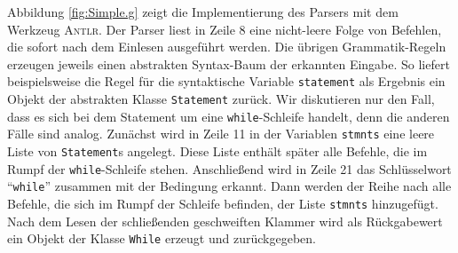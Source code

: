 \vspace*{\fill} \pagebreak

\vspace*{\fill} \pagebreak

\noindent
Abbildung \ref{fig:Simple.g} zeigt die Implementierung des Parsers mit dem
Werkzeug \textsc{Antlr}.  Der Parser liest in Zeile 8 eine nicht-leere Folge von Befehlen,
die sofort nach dem Einlesen ausgef\"uhrt werden.  Die \"ubrigen Grammatik-Regeln erzeugen
jeweils einen abstrakten Syntax-Baum der erkannten Eingabe.  So liefert beispielsweise die
Regel f\"ur die syntaktische Variable \texttt{statement} als Ergebnis ein Objekt der
abstrakten Klasse \texttt{Statement} zur\"uck.  Wir diskutieren nur den Fall, dass es sich
bei dem Statement um eine \texttt{while}-Schleife handelt, denn die anderen F\"alle sind
analog.  Zun\"achst wird in Zeile 11 in der Variablen \texttt{stmnts} eine leere Liste  von
\texttt{Statement}s angelegt. 
Diese Liste enth\"alt sp\"ater alle Befehle, die im Rumpf der \texttt{while}-Schleife stehen.
Anschlie{\ss}end wird in Zeile 21 das Schl\"usselwort ``\texttt{while}'' zusammen mit der Bedingung erkannt.
Dann werden der Reihe nach alle Befehle, die sich im Rumpf der Schleife befinden, der
Liste \texttt{stmnts} hinzugef\"ugt.  Nach dem Lesen der schlie{\ss}enden geschweiften Klammer
wird als R\"uckgabewert ein Objekt der Klasse \texttt{While} erzeugt und zur\"uckgegeben.


